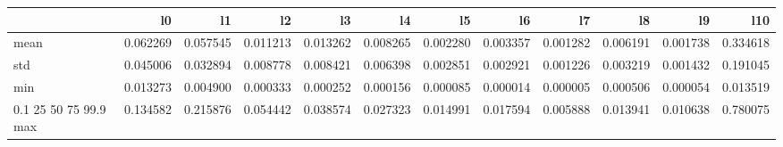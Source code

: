 \begin{tabular}{lrrrrrrrrrrr}
\toprule
 & l0 & l1 & l2 & l3 & l4 & l5 & l6 & l7 & l8 & l9 & l10 \\
\midrule
mean & 0.062269 & 0.057545 & 0.011213 & 0.013262 & 0.008265 & 0.002280 & 0.003357 & 0.001282 & 0.006191 & 0.001738 & 0.334618 \\
std & 0.045006 & 0.032894 & 0.008778 & 0.008421 & 0.006398 & 0.002851 & 0.002921 & 0.001226 & 0.003219 & 0.001432 & 0.191045 \\
min & 0.013273 & 0.004900 & 0.000333 & 0.000252 & 0.000156 & 0.000085 & 0.000014 & 0.000005 & 0.000506 & 0.000054 & 0.013519 \\
0.1%
25%
50%
75%
99.9%
max & 0.134582 & 0.215876 & 0.054442 & 0.038574 & 0.027323 & 0.014991 & 0.017594 & 0.005888 & 0.013941 & 0.010638 & 0.780075 \\
\bottomrule
\end{tabular}
